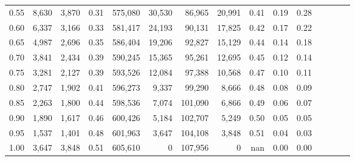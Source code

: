 \begin{tabular}{rrrcrrrrrrrrrrr}
0.55 &   8,630 &   3,870 &                                       0.31 &  575,080 &   30,530 &   86,965 &   20,991 &  0.41 &  0.19 &                         0.28 \\
0.60 &   6,337 &   3,166 &                                       0.33 &  581,417 &   24,193 &   90,131 &   17,825 &  0.42 &  0.17 &                         0.22 \\
0.65 &   4,987 &   2,696 &                                       0.35 &  586,404 &   19,206 &   92,827 &   15,129 &  0.44 &  0.14 &                         0.18 \\
0.70 &   3,841 &   2,434 &                                       0.39 &  590,245 &   15,365 &   95,261 &   12,695 &  0.45 &  0.12 &                         0.14 \\
0.75 &   3,281 &   2,127 &                                       0.39 &  593,526 &   12,084 &   97,388 &   10,568 &  0.47 &  0.10 &                         0.11 \\
0.80 &   2,747 &   1,902 &                                       0.41 &  596,273 &    9,337 &   99,290 &    8,666 &  0.48 &  0.08 &                         0.09 \\
0.85 &   2,263 &   1,800 &                                       0.44 &  598,536 &    7,074 &  101,090 &    6,866 &  0.49 &  0.06 &                         0.07 \\
0.90 &   1,890 &   1,617 &                                       0.46 &  600,426 &    5,184 &  102,707 &    5,249 &  0.50 &  0.05 &                         0.05 \\
0.95 &   1,537 &   1,401 &                                       0.48 &  601,963 &    3,647 &  104,108 &    3,848 &  0.51 &  0.04 &                         0.03 \\
1.00 &   3,647 &   3,848 &                                       0.51 &  605,610 &        0 &  107,956 &        0 &   nan &  0.00 &                         0.00 \\
\bottomrule
\end{tabular}
